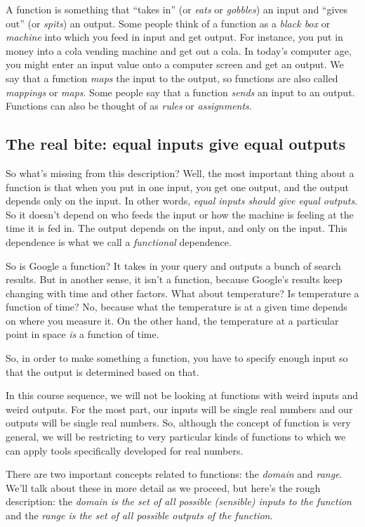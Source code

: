 \documentclass{amsart}
\begin{document}
A function is something that ``takes in'' (or {\em eats} or {\em
gobbles}) an input and ``gives out'' (or {\em spits}) an output. Some
people think of a function as a {\em black box} or {\em machine} into
which you feed in input and get output. For instance, you put in money
into a cola vending machine and get out a cola. In today's computer
age, you might enter an input value onto a computer screen and get an
output. We say that a function {\em maps} the input to the output, so
functions are also called {\em mappings} or {\em maps}. Some people
say that a function {\em sends} an input to an output. Functions can
also be thought of as {\em rules} or {\em assignments}.

\subsection{The real bite: equal inputs give equal outputs}

So what's missing from this description? Well, the most important
thing about a function is that when you put in one input, you get one
output, and the output depends only on the input. In other words, {\em
equal inputs should give equal outputs}. So it doesn't depend on who
feeds the input or how the machine is feeling at the time it is fed
in. The output depends on the input, and only on the input. This
dependence is what we call a {\em functional} dependence.

So is Google a function? It takes in your query and outputs a bunch of
search results. But in another sense, it isn't a function, because
Google's results keep changing with time and other factors. What about
temperature? Is temperature a function of time?  No, because what the
temperature is at a given time depends on where you measure it. On the
other hand, the temperature at a particular point in space {\em is} a
function of time.

So, in order to make something a function, you have to specify enough
input so that the output is determined based on that.

In this course sequence, we will not be looking at functions with
weird inputs and weird outputs. For the most part, our inputs will be
single real numbers and our outputs will be single real numbers. So,
although the concept of function is very general, we will be
restricting to very particular kinds of functions to which we can
apply tools specifically developed for real numbers.

There are two important concepts related to functions: the {\em
domain} and {\em range}. We'll talk about these in more detail as we
proceed, but here's the rough description: the {\em domain is the set
of all possible (sensible) inputs to the function} and the {\em range
is the set of all possible outputs of the function}.
\end{document}
